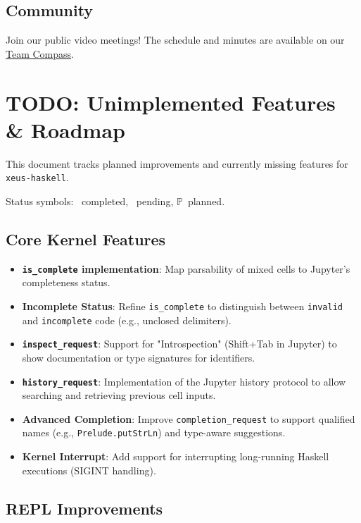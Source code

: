 \documentclass[11pt]{scrartcl}
\newcommand{\tododone}{\textcolor{green!45!black}{\ding{51}}}
\newcommand{\todopending}{\textcolor{red!65!black}{\ding{55}}}
\newcommand{\todoplanned}{\textcolor{blue!70!black}{$\mathbb{P}$}}
\begin{document}
\subsection{Community}


Join our public video meetings! The schedule and minutes are available on our \href{https://jupyter-xeus.github.io/}{Team Compass}.

\section{TODO: Unimplemented Features \& Roadmap}
\label{sec:todo}


This document tracks planned improvements and currently missing features for \texttt{xeus-haskell}.

Status symbols: \tododone\ completed, \todopending\ pending, \todoplanned\ planned.
\subsection{Core Kernel Features}


\begin{itemize}[leftmargin=*,itemsep=0.45em]
\item[\tododone] \textbf{\texttt{is\_complete} implementation}: Map parsability of mixed cells to Jupyter's completeness status.
\item[\todopending] \textbf{Incomplete Status}: Refine \texttt{is\_complete} to distinguish between \texttt{invalid} and \texttt{incomplete} code (e.g., unclosed delimiters).
\item[\tododone] \textbf{\texttt{inspect\_request}}: Support for "Introspection" (Shift+Tab in Jupyter) to show documentation or type signatures for identifiers.
\item[\todopending] \textbf{\texttt{history\_request}}: Implementation of the Jupyter history protocol to allow searching and retrieving previous cell inputs.
\item[\todopending] \textbf{Advanced Completion}: Improve \texttt{completion\_request} to support qualified names (e.g., \texttt{Prelude.putStrLn}) and type-aware suggestions.
\item[\todopending] \textbf{Kernel Interrupt}: Add support for interrupting long-running Haskell executions (SIGINT handling).
\end{itemize}


\subsection{REPL Improvements}
\end{document}
